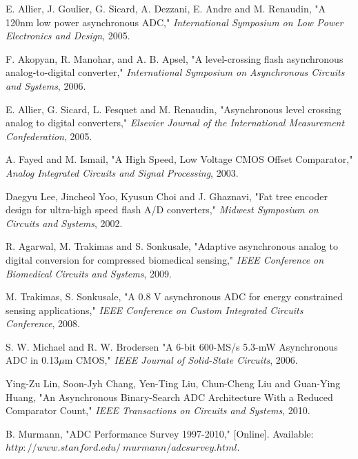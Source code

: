 \begin{thebibliography}{10}


E. Allier, J. Goulier, G. Sicard, A. Dezzani, E. Andre and M. Renaudin, "A 120nm low power asynchronous ADC," \emph {International Symposium on Low Power Electronics and Design}, 2005.

F. Akopyan, R. Manohar, and A. B. Apsel, "A level-crossing flash asynchronous analog-to-digital converter," \emph {International Symposium on Asynchronous Circuits and Systems}, 2006.

E. Allier, G. Sicard, L. Fesquet and M. Renaudin, "Asynchronous level crossing analog to digital converters," \emph {Elsevier Journal of the International Measurement Confederation}, 2005.

A. Fayed and M. Ismail, "A High Speed, Low Voltage CMOS Offset Comparator," \emph {Analog Integrated Circuits and Signal Processing}, 2003.

 Daegyu Lee, Jincheol Yoo, Kyusun Choi and J. Ghaznavi, "Fat tree encoder design for ultra-high speed flash A/D converters," \emph { Midwest Symposium on Circuits and Systems}, 2002.


R. Agarwal, M. Trakimas and S. Sonkusale, "Adaptive asynchronous analog to digital conversion for compressed biomedical sensing," \emph {IEEE Conference on Biomedical Circuits and Systems}, 2009.

M. Trakimas, S. Sonkusale,  "A 0.8 V asynchronous ADC for energy constrained sensing applications," \emph {IEEE Conference on Custom Integrated Circuits Conference}, 2008.

S. W. Michael and R. W. Brodersen "A 6-bit 600-MS/s 5.3-mW Asynchronous ADC in 0.13$\mu$m CMOS," \emph {IEEE Journal of Solid-State Circuits}, 2006.

Ying-Zu Lin, Soon-Jyh Chang, Yen-Ting Liu, Chun-Cheng Liu and Guan-Ying Huang, "An Asynchronous Binary-Search ADC Architecture With a Reduced Comparator Count," \emph {IEEE Transactions on Circuits and Systems}, 2010.

B. Murmann, "ADC Performance Survey 1997-2010," [Online]. Available: $http://www.stanford.edu/~murmann/adcsurvey.html$.

\end{thebibliography}
